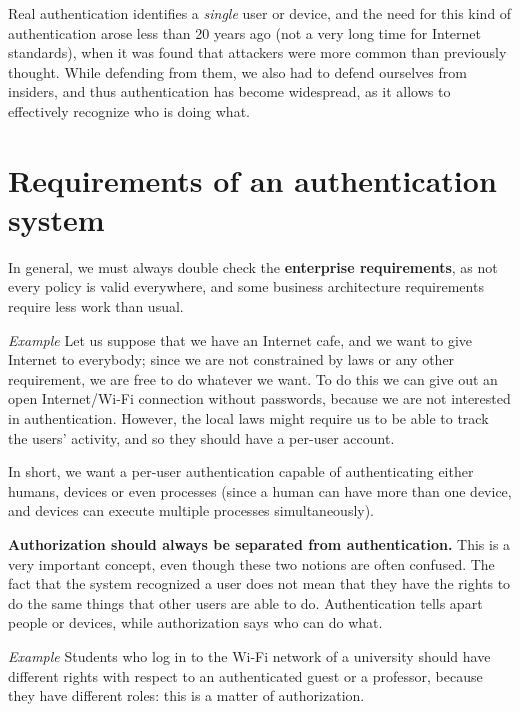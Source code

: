 Real authentication identifies a \textit{single} user or device, and the need for this kind of authentication arose less than 20 years ago (not a very long time for Internet standards), when it was found that attackers were more common than previously thought. While defending from them, we also had to defend ourselves from insiders, and thus authentication has become widespread, as it allows to effectively recognize who is doing what.


\section{Requirements of an authentication system}
In general, we must always double check the \textbf{enterprise requirements}, as not every policy is valid everywhere, and some business architecture requirements require less work than usual.

\vspace{0.5em}

\emph{Example} Let us suppose that we have an Internet cafe, and we want to give Internet to everybody; since we are not constrained by laws or any other requirement, we are free to do whatever we want. To do this we can give out an open Internet/Wi-Fi connection without passwords, because we are not interested in authentication. However, the local laws might require us to be able to track the users' activity, and so they should have a per-user account.

\vspace{0.5em}
 
In short, we want a per-user authentication capable of authenticating either humans, devices or even processes (since a human can have more than one device, and devices can execute multiple processes simultaneously). 
 
\textbf{Authorization should always be separated from authentication.} This is a very important concept, even though these two notions are often confused. The fact that the system recognized a user does not mean that they have the rights to do the same things that other users are able to do. Authentication tells apart people or devices, while authorization says who can do what.

\vspace{0.5em}

\emph{Example} Students who log in to the Wi-Fi network of a university should have different rights with respect to an authenticated guest or a professor, because they have different roles: this is a matter of authorization.

